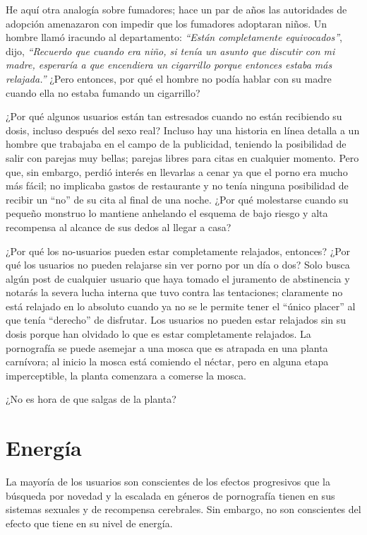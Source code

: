 \documentclass[
  spanish,
  openany]{book}
\begin{document}
He aquí otra analogía sobre fumadores; hace un par de años las autoridades de adopción amenazaron con impedir que los fumadores adoptaran niños. Un hombre llamó iracundo al departamento: \emph{``Están completamente equivocados''}, dijo, \emph{``Recuerdo que cuando era niño, si tenía un asunto que discutir con mi madre, esperaría a que encendiera un cigarrillo porque entonces estaba más relajada.''} ¿Pero entonces, por qué el hombre no podía hablar con su madre cuando ella no estaba fumando un cigarrillo?

¿Por qué algunos usuarios están tan estresados cuando no están recibiendo su dosis, incluso después del sexo real? Incluso hay una historia en línea detalla a un hombre que trabajaba en el campo de la publicidad, teniendo la posibilidad de salir con parejas muy bellas; parejas libres para citas en cualquier momento. Pero que, sin embargo, perdió interés en llevarlas a cenar ya que el porno era mucho más fácil; no implicaba gastos de restaurante y no tenía ninguna posibilidad de recibir un ``no'' de su cita al final de una noche. ¿Por qué molestarse cuando su pequeño monstruo lo mantiene anhelando el esquema de bajo riesgo y alta recompensa al alcance de sus dedos al llegar a casa?

¿Por qué los no-usuarios pueden estar completamente relajados, entonces? ¿Por qué los usuarios no pueden relajarse sin ver porno por un día o dos? Solo busca algún post de cualquier usuario que haya tomado el juramento de abstinencia y notarás la severa lucha interna que tuvo contra las tentaciones; claramente no está relajado en lo absoluto cuando ya no se le permite tener el ``único placer'' al que tenía ``derecho'' de disfrutar. Los usuarios no pueden estar relajados sin su dosis porque han olvidado lo que es estar completamente relajados. La pornografía se puede asemejar a una mosca que es atrapada en una planta carnívora; al inicio la mosca está comiendo el néctar, pero en alguna etapa imperceptible, la planta comenzara a comerse la mosca.

¿No es hora de que salgas de la planta?

\hypertarget{energuxeda}{%
\section{Energía}\label{energuxeda}}

La mayoría de los usuarios son conscientes de los efectos progresivos que la búsqueda por novedad y la escalada en géneros de pornografía tienen en sus sistemas sexuales y de recompensa cerebrales. Sin embargo, no son conscientes del efecto que tiene en su nivel de energía.
\end{document}
